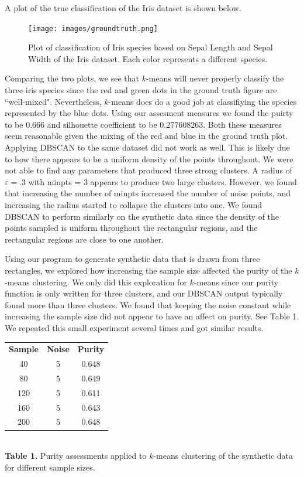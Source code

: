 \documentclass[psamsfonts,onesided,10pt]{amsart}
\begin{document}
A plot of the true classification of the Iris dataset is shown below.
\begin{figure}[H]
    \centering
    {\texttt{[image: images/groundtruth.png]}} \\
    \caption{Plot of classification of Iris species based on Sepal Length and Sepal Width of the Iris dataset. Each color represents a different species.}
\end{figure}

Comparing the two plots, we see that $k$-means will never properly classify the three iris species 
since the red and green dots in the ground truth figure are ``well-mixed". Nevertheless, $k$-means 
does do a good job at classifiying the species represented by the blue dots. Using our assesment 
measures we found the puirty to be $0.666$ and silhouette coefficient to be $0.277608263$. 
Both these measures seem reasonable given the mixing of the red and blue in the ground truth plot.
Applying DBSCAN to the same dataset did not work as well. This is likely due to how there appears
 to be a uniform density of the points throughout. We were not able to find any parameters that 
produced three strong clusters. A radius of $\varepsilon = .3$  with minpts = 3 appears to 
produce two large clusters. However, we found that increasing the number of minpts increased 
the number of noise points, and increasing the radius started to collapse the clusters into one. 
We found DBSCAN to perform similarly on the synthetic data since the density of the 
points sampled is uniform throughout the rectangular regions, and the rectangular regions are 
close to one another.

Using our program to generate synthetic data that is drawn from three rectangles, we explored 
how increasing the sample size affected the purity of the $k$-means clustering. We only did this 
exploration for $k$-means since our purity function is only written for three clusters, and our 
DBSCAN output typically found more than three clusters. We found that 
keeping the noise constant while increasing the sample size did not appear to have an affect on 
purity. See Table 1. We repeated this small experiment several times and got similar results. 

\vspace{1ex}
\begin{center}
\begin{tabular}{ |c|c|c| } 
 \hline
\textbf{Sample} & \textbf{Noise} & \textbf{Purity}\\ 
40 & 5 & 0.648 \\ 
80 & 5 & 0.649 \\ 
120 & 5 & 0.611 \\ 
160 & 5 & 0.643 \\ 
200 & 5 & 0.648 \\ 
 \hline
\end{tabular}\\
\textbf{Table 1.} Purity assessments applied to $k$-means clustering of the synthetic data for 
different sample sizes.
\end{center}
\vspace{1ex}
\end{document}
